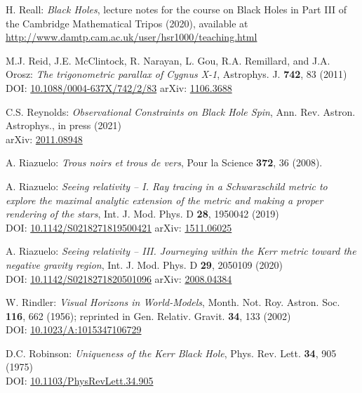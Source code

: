 \begin{thebibliography}{123}
H. Reall: {\em Black Holes}, lecture notes for the course on Black Holes in
Part III of the Cambridge Mathematical Tripos (2020), available at \\
\url{http://www.damtp.cam.ac.uk/user/hsr1000/teaching.html}

M.J. Reid, J.E. McClintock, R. Narayan, L. Gou, R.A. Remillard, and J.A. Orosz:
{\em The trigonometric parallax of Cygnus X-1},
Astrophys. J. {\bf 742}, 83 (2011)\\
DOI: \href{https://doi.org/10.1088/0004-637X/742/2/83}{10.1088/0004-637X/742/2/83}\hfill
arXiv: \href{https://arxiv.org/abs/1106.3688}{1106.3688}

C.S. Reynolds:
{\em Observational Constraints on Black Hole Spin},
Ann. Rev. Astron. Astrophys., in press (2021)\\
arXiv: \href{https://arxiv.org/abs/2011.08948}{2011.08948}

A. Riazuelo:
{\em Trous noirs et trous de vers},
Pour la Science {\bf 372}, 36 (2008).

A. Riazuelo:
{\em Seeing relativity -- I. Ray tracing in a Schwarzschild metric to explore the maximal analytic extension of the metric and making a proper rendering of the stars},
Int. J. Mod. Phys. D {\bf 28}, 1950042 (2019)\\
DOI: \href{https://doi.org/10.1142/S0218271819500421}{10.1142/S0218271819500421}
\hfill
arXiv: \href{https://arxiv.org/abs/1511.06025}{1511.06025}

A. Riazuelo:
{\em Seeing relativity -- III. Journeying within the Kerr metric toward the negative gravity region},
Int. J. Mod. Phys. D {\bf 29}, 2050109 (2020)\\
DOI: \href{https://doi.org/10.1142/S0218271820501096}{10.1142/S0218271820501096}\hfill
arXiv: \href{https://arxiv.org/abs/2008.04384}{2008.04384}

W. Rindler: {\em Visual Horizons in World-Models},
Month. Not. Roy. Astron. Soc. {\bf 116}, 662 (1956);
reprinted in Gen. Relativ. Gravit. {\bf 34}, 133 (2002)\\
DOI: \href{https://doi.org/10.1023/A:1015347106729}{10.1023/A:1015347106729}

D.C. Robinson: {\em Uniqueness of the Kerr Black Hole},
Phys. Rev. Lett. {\bf 34}, 905 (1975)\\
DOI: \href{https://doi.org/10.1103/PhysRevLett.34.905}{10.1103/PhysRevLett.34.905}


\end{thebibliography}
